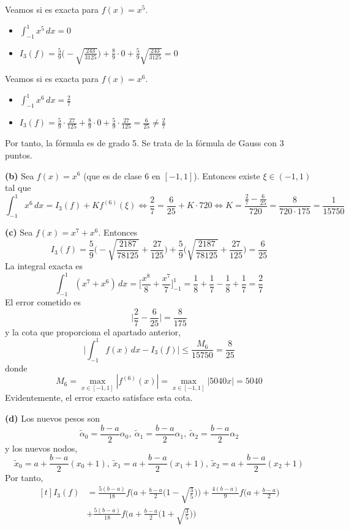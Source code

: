 \documentclass[12pt]{report}
\begin{document}
Veamos si es exacta para $f(x) = x^5$.
\begin{itemize}
    \item $\displaystyle \int_{-1}^1 x^5 \, dx = 0$
    \item $\displaystyle I_3(f) = \frac{5}{9} \biggl(-\sqrt{\frac{243}{3125}} \biggr) + \frac{8}{9} \cdot 0 + \frac{5}{9} \sqrt{\frac{243}{3125}} = 0$
\end{itemize}
Veamos si es exacta para $f(x) = x^6$.
\begin{itemize}
    \item $\displaystyle \int_{-1}^1 x^6 \, dx = \frac{2}{7}$
    \item $\displaystyle I_3(f) = \frac{5}{9} \cdot \frac{27}{125} + \frac{8}{9} \cdot 0 + \frac{5}{9} \cdot \frac{27}{125} = \frac{6}{25} \neq \frac{2}{7}$
\end{itemize}
Por tanto, la fórmula es de grado 5. Se trata de la fórmula de Gauss con 3 puntos.

\vspace{2mm}
\textbf{(b) } Sea $f(x) = x^6$ (que es de clase 6 en $[-1,1]$). Entonces existe $\xi \in (-1,1)$ tal que 
\[\int_{-1}^1 x^6 \, dx = I_3(f) + Kf^{(6)}(\xi) \iff \frac{2}{7} = \frac{6}{25} + K \cdot 720 \iff K = \frac{\frac{2}{7} - \frac{6}{25}}{720} = \frac{8}{720 \cdot 175} = \frac{1}{15750}\]

\vspace{2mm}
\textbf{(c) } Sea $f(x) = x^7 + x^6$. Entonces
\[
I_3(f) = \frac{5}{9}\biggl(-\sqrt{\frac{2187}{78125}} + \frac{27}{125} \biggr) + \frac{5}{9}\biggl(\sqrt{\frac{2187}{78125}} + \frac{27}{125} \biggr) = \frac{6}{25}
\]
La integral exacta es
\[\int_{-1}^1 (x^7 + x^6) \, dx = \biggl[\frac{x^8}{8} + \frac{x^7}{7} \biggr]_{-1}^1 = \frac{1}{8} + \frac{1}{7} - \frac{1}{8} + \frac{1}{7} = \frac{2}{7}\]
El error cometido es 
\[\biggl| \frac{2}{7} - \frac{6}{25} \biggr| = \frac{8}{175}\]
y la cota que proporciona el apartado anterior,
\[\biggl|\int_{-1}^1 f(x) \, dx - I_3(f) \biggr| \leq \frac{M_6}{15750} = \frac{8}{25}\]
donde 
\[M_6 = \max_{x \in [-1,1]} |f^{(6)}(x)| = \max_{x \in [-1,1]} |5040x| = 5040\]
Evidentemente, el error exacto satisface esta cota.

\vspace{2mm}
\textbf{(d) } Los nuevos pesos son
\[\tilde{\alpha}_0 = \frac{b-a}{2}\alpha_0, \ \tilde{\alpha}_1 = \frac{b-a}{2}\alpha_1, \ \tilde{\alpha}_2 = \frac{b-a}{2}\alpha_2\]
y los nuevos nodos,
\[\tilde{x}_0 = a + \frac{b-a}{2}(x_0 + 1), \ \tilde{x}_1 = a + \frac{b-a}{2}(x_1 + 1), \ \tilde{x}_2 = a + \frac{b-a}{2}(x_2 + 1)\]
Por tanto, 
\[
\begin{aligned}[t]
I_3(f) &= \frac{5(b-a)}{18}f \biggl(a + \frac{b-a}{2} \biggl(1-\sqrt{\frac{3}{5}} \biggr) \biggr) + \frac{4(b-a)}{9}f\biggl( a + \frac{b-a}{2} \biggr)  \\
&+ \frac{5(b-a)}{18}f \biggl(a + \frac{b-a}{2} \biggl(1+\sqrt{\frac{3}{5}} \biggr) \biggr)
\end{aligned}
\]
\end{document}
